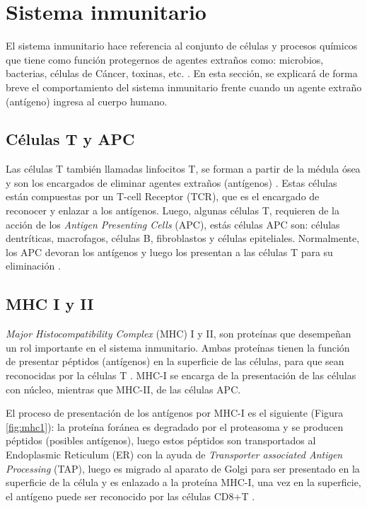 \section{Sistema inmunitario}

El sistema inmunitario hace referencia al conjunto de células y procesos químicos que tiene como función protegernos de agentes extraños como: microbios, bacterias, células de Cáncer, toxinas, etc. \cite{marshall2018introduction}. En esta sección, se explicará de forma breve el comportamiento del sistema inmunitario frente cuando un agente extraño (antígeno) ingresa al cuerpo humano.

\subsection{Células T y APC}

Las células T también llamadas linfocitos T, se forman a partir de la médula ósea y son los encargados de eliminar agentes extraños (antígenos) \cite{NCIdictionary2022}. Estas células están compuestas por un T-cell Receptor (TCR), que es el encargado de reconocer y enlazar a los antígenos. Luego, algunas células T, requieren de la acción de los \textit{Antigen Presenting Cells} (APC), estás células APC son: células dentríticas, macrofagos, células B, fibroblastos y células epiteliales. Normalmente, los APC devoran los antígenos y luego los presentan a las células T para su eliminación  \citep{marshall2018introduction}.


\subsection{MHC I y II}

\textit{Major Histocompatibility Complex} (MHC) I y II, son proteínas que desempeñan un rol importante en el sistema inmunitario. Ambas proteínas tienen la función de presentar péptidos (antígenos) en la superficie de las células, para que sean reconocidas por la células T \citep{abualrous2021major}. MHC-I se encarga de la presentación de las células con núcleo, mientras que MHC-II, de las células APC. 

El proceso de presentación de los antígenos por MHC-I es el siguiente (Figura \ref{fig:mhc1}): la proteína foránea es degradado por el proteasoma y se producen péptidos (posibles antígenos), luego estos péptidos son transportados al Endoplasmic Reticulum (ER) con la ayuda de \textit{Transporter associated Antigen Processing} (TAP), luego es migrado al aparato de Golgi para ser presentado en la superficie de la célula y es enlazado a la proteína MHC-I, una vez en la superficie, el antígeno puede ser reconocido por las células CD8+T \citep{zhang2019application}.




